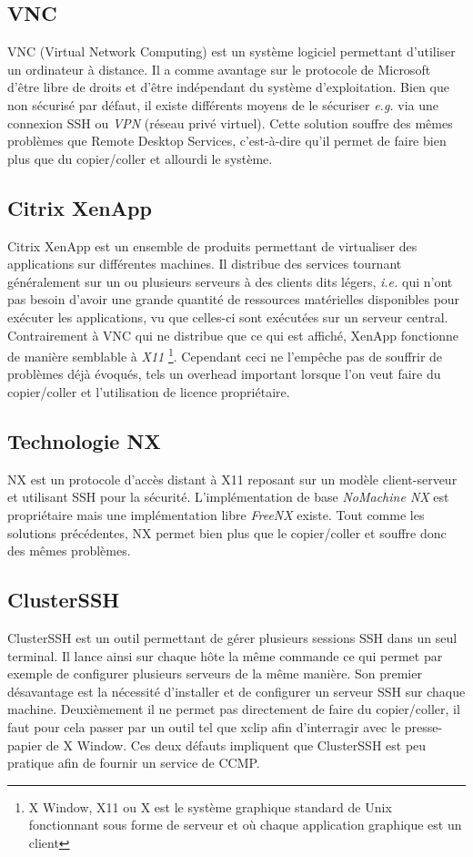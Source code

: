 \subsection{VNC}
VNC (Virtual Network Computing) \cite{wiki:vnc} est un système logiciel
permettant d'utiliser
un ordinateur à distance. Il a comme avantage sur le protocole de Microsoft
d'être libre de droits et d'être indépendant du système d'exploitation.
Bien que non sécurisé par défaut, il existe différents moyens de le sécuriser
\emph{e.g.} via une connexion SSH ou \emph{VPN} (réseau privé virtuel).
Cette solution souffre des mêmes problèmes que Remote Desktop Services,
c'est-à-dire qu'il permet de faire bien plus que du copier/coller et
allourdi le système.

\subsection{Citrix XenApp}
Citrix XenApp \cite{wiki:xenapp} est un ensemble de produits permettant de
virtualiser des applications sur différentes machines. Il distribue
des services tournant généralement sur un ou plusieurs serveurs à des
clients dits légers, \emph{i.e.} qui n'ont pas besoin d'avoir une grande
quantité de ressources matérielles disponibles pour exécuter
les applications, vu que celles-ci sont exécutées sur un serveur central.
Contrairement à VNC qui ne distribue que ce qui est
affiché, XenApp fonctionne de manière semblable à \emph{X11}
\footnote{X Window, X11 ou X est le système
graphique standard de Unix fonctionnant sous forme de serveur et où
chaque application graphique est un client}. Cependant ceci ne l'empêche
pas de souffrir de problèmes déjà évoqués, tels un overhead important lorsque
l'on veut faire du copier/coller et l'utilisation de licence propriétaire.

\subsection{Technologie NX}
NX \cite{wiki:nx} est un protocole d'accès distant à X11 reposant sur un
modèle client-serveur et utilisant SSH pour la sécurité. L'implémentation
de base \emph{NoMachine NX} est propriétaire mais une implémentation libre
\emph{FreeNX} \cite{freenx} existe. Tout comme les solutions précédentes, NX
permet bien plus que le copier/coller et souffre donc des mêmes problèmes.

\subsection{ClusterSSH}
ClusterSSH\cite{clusterssh} est un outil permettant de gérer plusieurs
sessions SSH dans un seul terminal. Il lance ainsi sur chaque hôte la même
commande ce qui permet par exemple de configurer plusieurs serveurs de la
même manière. Son premier désavantage est la nécessité d'installer et de
configurer un serveur SSH sur chaque machine. Deuxièmement il ne permet
pas directement de faire du copier/coller, il faut pour cela passer
par un outil tel que xclip\cite{xclip} afin d'interragir avec le presse-papier
de X Window. Ces deux défauts impliquent que ClusterSSH est peu pratique
afin de fournir un service de CCMP.

